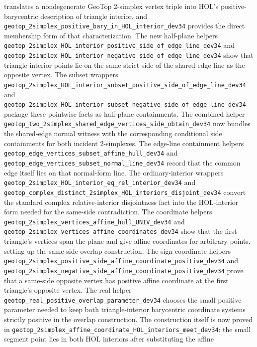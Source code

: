 \documentclass{article}
\begin{document}
translates a nondegenerate GeoTop 2-simplex vertex triple into HOL's
positive-barycentric description of triangle interior, and
\texttt{geotop\_2simplex\_positive\_bary\_in\_HOL\_interior\_dev34}
provides the direct membership form of that characterization. The new
half-plane helpers
\texttt{geotop\_2simplex\_HOL\_interior\_positive\_side\_of\_edge\_line\_dev34}
and
\texttt{geotop\_2simplex\_HOL\_interior\_negative\_side\_of\_edge\_line\_dev34}
show that triangle interior points lie on the same strict side of the shared
edge line as the opposite vertex. The subset wrappers
\texttt{geotop\_2simplex\_HOL\_interior\_subset\_positive\_side\_of\_edge\_line\_dev34}
and
\texttt{geotop\_2simplex\_HOL\_interior\_subset\_negative\_side\_of\_edge\_line\_dev34}
package these pointwise facts as half-plane containments. The combined helper
\texttt{geotop\_two\_2simplex\_shared\_edge\_vertices\_side\_obtain\_dev34}
now bundles the shared-edge normal witness with the corresponding conditional
side containments for both incident 2-simplexes. The edge-line containment
helpers \texttt{geotop\_edge\_vertices\_subset\_affine\_hull\_dev34} and
\texttt{geotop\_edge\_vertices\_subset\_normal\_line\_dev34} record that the
common edge itself lies on that normal-form line. The ordinary-interior
wrappers \texttt{geotop\_2simplex\_HOL\_interior\_eq\_rel\_interior\_dev34}
and
\texttt{geotop\_complex\_distinct\_2simplex\_HOL\_interiors\_disjoint\_dev34}
convert the standard complex relative-interior disjointness fact into the
HOL-interior form needed for the same-side contradiction. The coordinate
helpers \texttt{geotop\_2simplex\_vertices\_affine\_hull\_UNIV\_dev34} and
\texttt{geotop\_2simplex\_vertices\_affine\_coordinates\_dev34} show that the
first triangle's vertices span the plane and give affine coordinates for
arbitrary points, setting up the same-side overlap construction. The
sign-coordinate helpers
\texttt{geotop\_2simplex\_positive\_side\_affine\_coordinate\_positive\_dev34}
and
\texttt{geotop\_2simplex\_negative\_side\_affine\_coordinate\_positive\_dev34}
prove that a same-side opposite vertex has positive affine coordinate at the
first triangle's opposite vertex. The real helper
\texttt{geotop\_real\_positive\_overlap\_parameter\_dev34} chooses the small
positive parameter needed to keep both triangle-interior barycentric coordinate
systems strictly positive in the overlap construction. The construction itself
is now proved in
\texttt{geotop\_2simplex\_affine\_coordinate\_HOL\_interiors\_meet\_dev34}: the
small segment point lies in both HOL interiors after substituting the affine
\end{document}
